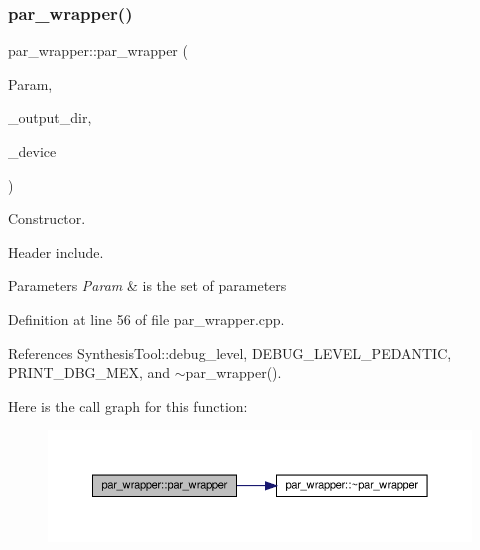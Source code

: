 \subsubsection{\texorpdfstring{par\+\_\+wrapper()}{par\_wrapper()}}
{\footnotesize\ttfamily par\+\_\+wrapper\+::par\+\_\+wrapper (\begin{DoxyParamCaption}\item[{const \hyperlink{Parameter_8hpp_a37841774a6fcb479b597fdf8955eb4ea}{Parameter\+Const\+Ref} \&}]{Param,  }\item[{const std\+::string \&}]{\+\_\+output\+\_\+dir,  }\item[{const \hyperlink{target__device_8hpp_acedb2b7a617e27e6354a8049fee44eda}{target\+\_\+device\+Ref} \&}]{\+\_\+device }\end{DoxyParamCaption})}



Constructor. 

Header include.


\begin{DoxyParams}{Parameters}
{\em Param} & is the set of parameters \\
\hline
\end{DoxyParams}


Definition at line 56 of file par\+\_\+wrapper.\+cpp.



References Synthesis\+Tool\+::debug\+\_\+level, D\+E\+B\+U\+G\+\_\+\+L\+E\+V\+E\+L\+\_\+\+P\+E\+D\+A\+N\+T\+IC, P\+R\+I\+N\+T\+\_\+\+D\+B\+G\+\_\+\+M\+EX, and $\sim$par\+\_\+wrapper().

Here is the call graph for this function\+:
\nopagebreak
\begin{figure}[H]
\begin{center}
\leavevmode
\includegraphics[width=350pt]{d1/d07/classpar__wrapper_abad8d571d4ce4a40e6812fa788f38613_cgraph}
\end{center}
\end{figure}
\mbox{\label{classpar__wrapper_a504b95aa213d10f0ea4db54c48c65601}} 
